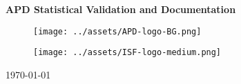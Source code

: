 \documentclass[12pt, letterpaper]{article}
\author{Allison K. Kunerth, Ph.D}
\begin{document}
\thispagestyle{empty}
\begin{center}
	{\large \textbf{{APD Statistical Validation and Documentation}}} 

	\begin{figure}[th]
		\centering
		\texttt{[image: ../assets/APD-logo-BG.png]}
	\end{figure}

	\vspace{\fill}
	\begin{figure}[th]
		\centering
		\texttt{[image: ../assets/ISF-logo-medium.png]}
	\end{figure}

	\vspace{\fill}



	{\normalsize \today}


	

\end{center}

\newpage

\thispagestyle{empty}
\end{document}
